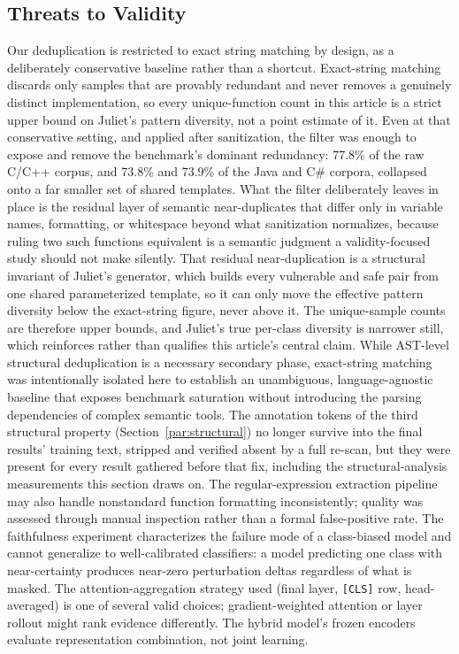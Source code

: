 \documentclass{ieeeaccess}
\begin{document}
\subsection{Threats to Validity}
\label{subsec:threats}
Our deduplication is restricted to exact string matching by design, as a deliberately conservative baseline rather than a shortcut. Exact-string matching discards only samples that are provably redundant and never removes a genuinely distinct implementation, so every unique-function count in this article is a strict upper bound on Juliet's pattern diversity, not a point estimate of it. Even at that conservative setting, and applied after sanitization, the filter was enough to expose and remove the benchmark's dominant redundancy: 77.8\% of the raw C/C++ corpus, and 73.8\% and 73.9\% of the Java and C\# corpora, collapsed onto a far smaller set of shared templates. What the filter deliberately leaves in place is the residual layer of semantic near-duplicates that differ only in variable names, formatting, or whitespace beyond what sanitization normalizes, because ruling two such functions equivalent is a semantic judgment a validity-focused study should not make silently. That residual near-duplication is a structural invariant of Juliet's generator, which builds every vulnerable and safe pair from one shared parameterized template, so it can only move the effective pattern diversity below the exact-string figure, never above it. The unique-sample counts are therefore upper bounds, and Juliet's true per-class diversity is narrower still, which reinforces rather than qualifies this article's central claim. While AST-level structural deduplication is a necessary secondary phase, exact-string matching was intentionally isolated here to establish an unambiguous, language-agnostic baseline that exposes benchmark saturation without introducing the parsing dependencies of complex semantic tools. The annotation tokens of the third structural property (Section~\ref{par:structural}) no longer survive into the final results' training text, stripped and verified absent by a full re-scan, but they were present for every result gathered before that fix, including the structural-analysis measurements this section draws on. The regular-expression extraction pipeline may also handle nonstandard function formatting inconsistently; quality was assessed through manual inspection rather than a formal false-positive rate. The faithfulness experiment characterizes the failure mode of a class-biased model and cannot generalize to well-calibrated classifiers: a model predicting one class with near-certainty produces near-zero perturbation deltas regardless of what is masked. The attention-aggregation strategy used (final layer, \texttt{[CLS]} row, head-averaged) is one of several valid choices; gradient-weighted attention or layer rollout might rank evidence differently. The hybrid model's frozen encoders evaluate representation combination, not joint learning.
\end{document}
